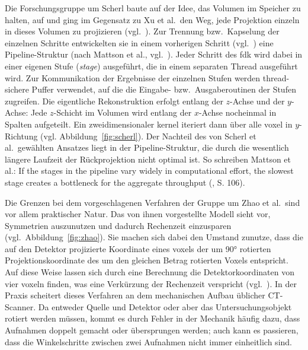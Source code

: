 Die Forschungsgruppe um Scherl baute auf der Idee, das Volumen im Speicher zu halten, auf und ging im Gegensatz zu Xu et
al.\ den Weg, jede Projektion einzeln in dieses Volumen zu projizieren (vgl.~\cite{scherlkeck}). Zur Trennung bzw.\
Kapselung der einzelnen Schritte entwickelten sie in einem vorherigen Schritt (vgl.~\cite{scherlhopp}) eine
Pipeline-Struktur (nach Mattson et al., vgl.~\cite{mattsan}). Jeder Schritt des \gls{fdk} wird dabei in einer eigenen
Stufe (\textit{stage}) ausgeführt, die in einem separaten Thread ausgeführt wird. Zur Kommunikation der Ergebnisse der
einzelnen Stufen werden thread-sichere Puffer verwendet, auf die die Eingabe- bzw.\ Ausgaberoutinen der Stufen
zugreifen. Die eigentliche Rekonstruktion erfolgt entlang der $z$-Achse und der $y$-Achse: Jede $z$-Schicht im Volumen
wird entlang der $x$-Achse nocheinmal in Spalten aufgeteilt. Ein zweidimensionaler \gls{kernel} iteriert dann über alle
\gls{voxel} in $y$-Richtung (vgl. Abbildung~\ref{fig:scherl}). Der Nachteil des von Scherl et al.\ gewählten Ansatzes
liegt in der Pipeline-Struktur, die durch die wesentlich längere Laufzeit der Rückprojektion nicht optimal ist. So
schreiben Mattson et al.: {\glqq}If the stages in the pipeline vary widely in computational effort, the slowest stage
creates a bottleneck for the aggregate throughput{\grqq} (\cite{mattsan}, S. 106).

Die Grenzen bei dem vorgeschlagenen Verfahren der Gruppe um Zhao et al.\ sind vor allem praktischer Natur. Das von ihnen
vorgestellte Modell sieht vor, Symmetrien auszunutzen und dadurch Rechenzeit einzusparen (vgl.\
Abbildung~\ref{fig:zhao}). Sie machen sich dabei den Umstand zunutze, dass die auf den Detektor projizierte Koordinate
eines \gls{voxel}s der um 90° rotierten Projektionskoordinate des um den gleichen Betrag rotierten Voxels entspricht.
Auf diese Weise lassen sich durch eine Berechnung die Detektorkoordinaten von vier \gls{voxel}n finden, was eine
Verkürzung der Rechenzeit verspricht (vgl.~\cite{zhao}). In der Praxis scheitert dieses Verfahren an dem mechanischen
Aufbau üblicher CT-Scanner. Da entweder Quelle und Detektor oder aber das Untersuchungsobjekt rotiert werden müssen,
kommt es durch Fehler in der Mechanik häufig dazu, dass Aufnahmen doppelt gemacht oder übersprungen werden; auch kann es
passieren, dass die Winkelschritte zwischen zwei Aufnahmen nicht immer einheitlich sind.

